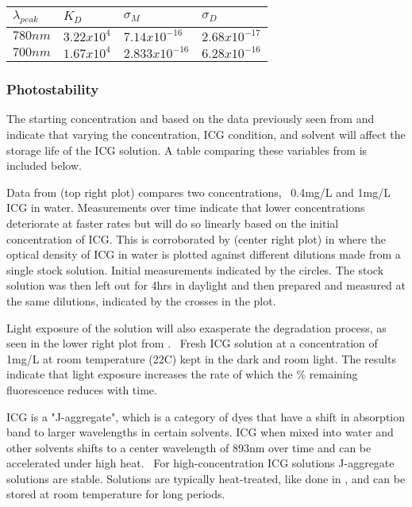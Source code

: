 \begin{table}
	\centering
	\begin{tabularx}{0.8\textwidth} { 
		| >{\centering\arraybackslash}X 
		| >{\centering\arraybackslash}X 
		| >{\centering\arraybackslash}X 
		| >{\centering\arraybackslash}X | }
		\hline
		$\lambda_{peak}$ & $K_D$ & $\sigma_M$ & $\sigma_D$\\
		\hline
		$780nm$ & $3.22x10^4$ & $7.14x10^{-16}$ & $2.68x10^{-17}$\\
		\hline
		$700nm$ & $1.67x10^4$ & $2.833x10^{-16}$ & $6.28x10^{-16}$\\
		\hline
	\end{tabularx}
\end{table}
\clearpage
\subsubsection{ Photostability}
The starting concentration and based on the data previously seen from \cite{hozer} and \cite{landsman} indicate that varying the concentration, ICG condition, and solvent will affect the storage life of the ICG solution. A table comparing these variables from\cite{landsman} is included below. 

Data from \cite{saxena}(top right plot) compares two concentrations,  0.4mg/L and 1mg/L ICG in water. Measurements over time indicate that lower concentrations deteriorate at faster rates but will do so linearly based on the initial concentration of ICG. This is corroborated by \cite{hozer}(center right plot) in where the optical density of ICG in water is plotted against different dilutions made from a single stock solution. Initial measurements indicated by the circles. The stock solution was then left out for 4hrs in daylight and then prepared and measured at the same dilutions, indicated by the crosses in the plot. 

Light exposure of the solution will also exasperate the degradation process, as seen in the lower right plot from \cite{saxena}.  Fresh ICG solution at a concentration of 1mg/L at room temperature (22C) kept in the dark and room light. The results indicate that light exposure increases the rate of which the \% remaining fluorescence reduces with time. 


ICG is a "J-aggregate", which is a category of dyes that have a shift in absorption band to larger wavelengths in certain solvents. ICG when mixed into water and other solvents shifts to a center wavelength of 893nm over time and can be accelerated under high heat. 
For high-concentration ICG solutions J-aggregate solutions are stable. Solutions are typically heat-treated, like done in \cite{rotermund}, and can be stored at room temperature for long periods. 


